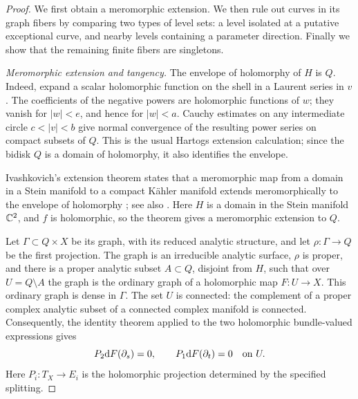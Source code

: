 \begin{proof}
We first obtain a meromorphic extension.  We then rule out curves in its
graph fibers by comparing two types of level sets: a level isolated at a
putative exceptional curve, and nearby levels containing a parameter
direction.  Finally we show that the remaining finite fibers are singletons.

\emph{Meromorphic extension and tangency.}
The envelope of holomorphy of $H$ is $Q$.  Indeed, expand a scalar
holomorphic function on the shell in a Laurent series in $v$.  The
coefficients of the negative powers are holomorphic functions of $w$;
they vanish for $|w|<e$, and hence for $|w|<a$.  Cauchy estimates on any
intermediate circle $c<|v|<b$ give normal convergence of the resulting
power series on compact subsets of $Q$.  This is the usual Hartogs
extension calculation; since the bidisk $Q$ is a domain of holomorphy, it
also identifies the envelope.

Ivashkovich's extension theorem states that a meromorphic map from a
domain in a Stein manifold to a compact K\"ahler manifold extends
meromorphically to the envelope of holomorphy
\cite[Theorem~2.2]{Ivashkovich2008}; see also \cite{Ivashkovich1992}.
Here $H$ is a domain in the Stein manifold $\mathbb C^2$, and $f$ is holomorphic,
so the theorem gives a meromorphic extension to $Q$.

Let $\Gamma\subset Q\times X$ be its graph, with its reduced analytic
structure, and let $\rho:\Gamma\to Q$ be the first projection.  The graph
is an irreducible analytic surface, $\rho$ is proper, and there is a proper
analytic subset $A\subset Q$, disjoint from $H$, such that over
$U=Q\setminus A$ the graph is the ordinary graph of a holomorphic map
$F:U\to X$.  This ordinary graph is dense in $\Gamma$.  The set $U$ is
connected: the complement of a proper complex analytic subset of a
connected complex manifold is connected.  Consequently, the identity
theorem applied to the two holomorphic bundle-valued expressions gives
\begin{equation}\label{eq:meromorphic-box-tangency}
 P_2\mathrm d F(\partial_s)=0,
 \qquad
 P_1\mathrm d F(\partial_t)=0
 \quad\hbox{on }U.
\end{equation}
Here $P_i:T_X\to E_i$ is the holomorphic projection determined by the
specified splitting.


\end{proof}
